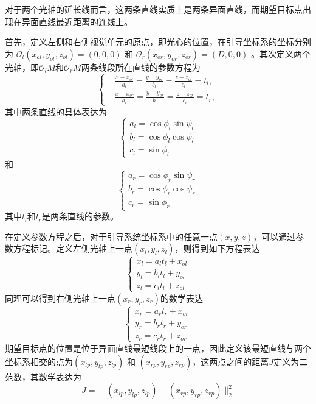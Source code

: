 对于两个光轴的延长线而言，这两条直线实质上是两条异面直线，而期望目标点出现在异面直线最近距离的连线上。

首先，定义左侧和右侧视觉单元的原点，即光心的位置，在引导坐标系的坐标分别为 $\mathcal{O}_l(x_{ol}, y_{ol}, z_{ol})=(0, 0, 0)$ 和 $\mathcal{O}_r(x_{or}, y_{or}, z_{or})=(D, 0, 0)$ 。其次定义两个光轴，即$\mathcal{O}_lM$和$\mathcal{O}_rM$两条线段所在直线的参数方程为
\begin{equation}  
\left \{
\begin{split}
&\frac{x-x_{ol}}{a_l} = \frac{y-y_{ol}}{b_l} = \frac{z-z_{ol}}{c_l} = t_l,\\
&\frac{x-x_{or}}{a_r} = \frac{y-y_{or}}{b_r} = \frac{z-z_{or}}{c_r} = t_r,
\end{split}
\right.
\end{equation}
其中两条直线的具体表达为
\begin{equation}  
\left\{ 
\begin{array}{lll} 
a_l = \cos \phi_l \sin \psi_l\\
b_l = \cos \phi_l \cos \psi_l\\
c_l = \sin \phi_l
\end{array} 
\right.
\end{equation}
和
\begin{equation} 
\left\{ 
\begin{array}{lll} 
a_r = \cos \phi_r \sin \psi_r\\
b_r = \cos \phi_r \cos \psi_r\\
c_r = \sin \phi_r
\end{array} 
\right.
\end{equation}
其中$t_l$和$t_r$是两条直线的参数。

在定义参数方程之后，对于引导系统坐标系中的任意一点$(x,y,z)$，可以通过参数方程标记。定义左侧光轴上一点$(x_l,y_l,z_l)$，则得到如下方程表达
\begin{equation}  
\left\{ 
\begin{array}{lll} 
x_l = a_l t_l + x_{ol} \\
y_l = b_l t_l + y_{ol} \\
z_l = c_l t_l + z_{ol}
\end{array} 
\right.
\end{equation}
同理可以得到右侧光轴上一点$(x_r,y_r,z_r)$的数学表达
\begin{equation}  
\left\{ 
\begin{array}{lll} 
x_r = a_r l_r + x_{or} \\
y_r = b_r t_r + y_{or} \\
z_r = c_r t_r + z_{or}
\end{array} 
\right.
\end{equation}
期望目标点的位置是位于异面直线最短线段上的一点，因此定义该最短直线与两个坐标系相交的点为$(x_{lp}, y_{lp}, z_{lp})$ 和 $(x_{rp}, y_{rp}, z_{rp})$，这两点之间的距离$J$定义为二范数，其数学表达为
\begin{equation}
J = \|(x_{lp}, y_{lp}, z_{lp}) - (x_{rp}, y_{rp}, z_{rp}) \|_2^2
\end{equation}


